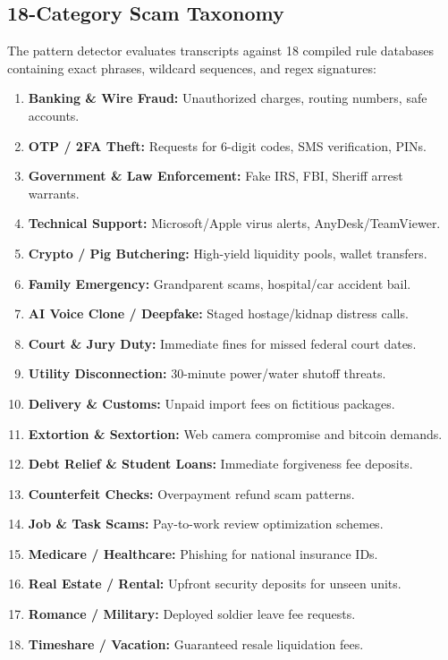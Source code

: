 \documentclass[conference]{IEEEtran}
\begin{document}
\subsection{18-Category Scam Taxonomy}
The pattern detector evaluates transcripts against 18 compiled rule databases containing exact phrases, wildcard sequences, and regex signatures:
\begin{enumerate}
    \item \textbf{Banking \& Wire Fraud:} Unauthorized charges, routing numbers, safe accounts.
    \item \textbf{OTP / 2FA Theft:} Requests for 6-digit codes, SMS verification, PINs.
    \item \textbf{Government \& Law Enforcement:} Fake IRS, FBI, Sheriff arrest warrants.
    \item \textbf{Technical Support:} Microsoft/Apple virus alerts, AnyDesk/TeamViewer.
    \item \textbf{Crypto / Pig Butchering:} High-yield liquidity pools, wallet transfers.
    \item \textbf{Family Emergency:} Grandparent scams, hospital/car accident bail.
    \item \textbf{AI Voice Clone / Deepfake:} Staged hostage/kidnap distress calls.
    \item \textbf{Court \& Jury Duty:} Immediate fines for missed federal court dates.
    \item \textbf{Utility Disconnection:} 30-minute power/water shutoff threats.
    \item \textbf{Delivery \& Customs:} Unpaid import fees on fictitious packages.
    \item \textbf{Extortion \& Sextortion:} Web camera compromise and bitcoin demands.
    \item \textbf{Debt Relief \& Student Loans:} Immediate forgiveness fee deposits.
    \item \textbf{Counterfeit Checks:} Overpayment refund scam patterns.
    \item \textbf{Job \& Task Scams:} Pay-to-work review optimization schemes.
    \item \textbf{Medicare / Healthcare:} Phishing for national insurance IDs.
    \item \textbf{Real Estate / Rental:} Upfront security deposits for unseen units.
    \item \textbf{Romance / Military:} Deployed soldier leave fee requests.
    \item \textbf{Timeshare / Vacation:} Guaranteed resale liquidation fees.
\end{enumerate}
\end{document}
